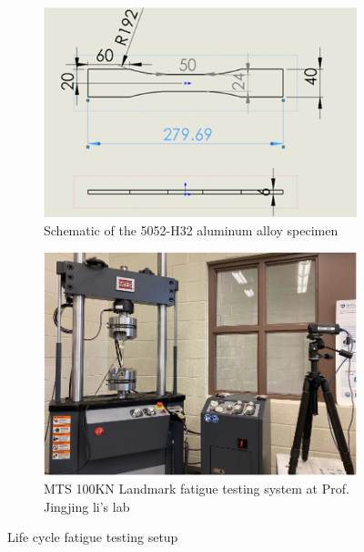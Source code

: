 \begin{figure}[tb]
  \centering
  \begin{subfigure}[t]{0.49\linewidth}
    \includegraphics[height=0.7\textwidth]{fig/specimen_dim.png}
    \caption{Schematic of the 5052-H32 aluminum alloy specimen}
    \label{fig: specimen dim}
  \end{subfigure}
  \begin{subfigure}[t]{0.49\linewidth}
    \includegraphics[height=0.7\textwidth]{fig/fatigue_testing_machine.png}
    \caption{MTS 100KN Landmark fatigue testing system at Prof. Jingjing li's lab}
    \label{fig: fatigue testing machine}
  \end{subfigure}

  \caption{Life cycle fatigue testing setup}
  \label{fig: fatigue testing setup}
\end{figure}

